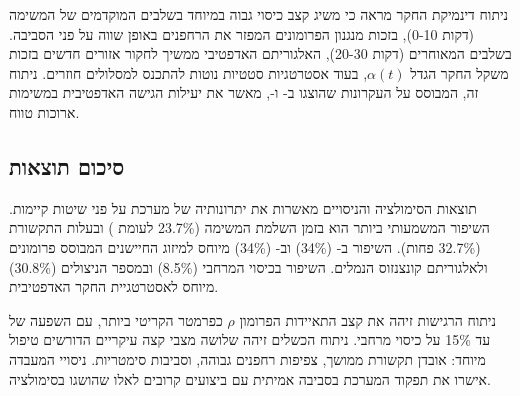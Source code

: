 ניתוח דינמיקת החקר מראה כי  משיג קצב כיסוי גבוה במיוחד בשלבים המוקדמים של המשימה (דקות 0-10), בזכות מנגנון הפרומונים המפזר את הרחפנים באופן שווה על פני הסביבה. בשלבים המאוחרים (דקות 20-30), האלגוריתם האדפטיבי ממשיך לחקור אזורים חדשים בזכות משקל החקר הגדל $\alpha(t)$, בעוד אסטרטגיות סטטיות נוטות להתכנס למסלולים חוזרים. ניתוח זה, המבוסס על העקרונות שהוצגו ב-\cite{Coppola2020Swarming} ו-\cite{Chung2018Swarm}, מאשר את יעילות הגישה האדפטיבית במשימות  ארוכות טווח.

\subsection{סיכום תוצאות}
\label{sec:ch08_results_summary}

תוצאות הסימולציה והניסויים מאשרות את יתרונותיה של מערכת  על פני שיטות קיימות. השיפור המשמעותי ביותר הוא בזמן השלמת המשימה (23.7\% לעומת ) ובעלות התקשורת (32.7\% פחות). השיפור ב- (34\%) וב- (34\%) מיוחס למיזוג החיישנים המבוסס פרומונים ולאלגוריתם קונצנזוס הנמלים. השיפור בכיסוי המרחבי (8.5\%) ובמספר הניצולים (30.8\%) מיוחס לאסטרטגיית החקר האדפטיבית.

ניתוח הרגישות זיהה את קצב התאיידות הפרומון $\rho$ כפרמטר הקריטי ביותר, עם השפעה של עד 15\% על כיסוי מרחבי. ניתוח הכשלים זיהה שלושה מצבי קצה עיקריים הדורשים טיפול מיוחד: אובדן תקשורת ממושך, צפיפות רחפנים גבוהה, וסביבות סימטריות. ניסויי המעבדה אישרו את תפקוד המערכת בסביבה אמיתית עם ביצועים קרובים לאלו שהושגו בסימולציה.

\cite{Campos2021ORBSLAM3, Lajoie2023SwarmSLAM, Xu2024D2SLAM, Burri2016EuRoC, Sturm2012Benchmark, Waharte2010SAR, Perez2018MultiUAV, Coppola2020Swarming, Chung2018Swarm}
